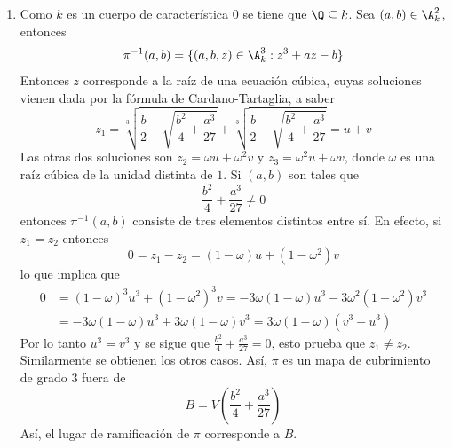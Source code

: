 \documentclass{article}
\begin{document}
\begin{enumerate}
    \item[(c)] Como $k$ es un cuerpo de característica $0$ se tiene que $\Q\subseteq k$. Sea 
    $(a,b)\in\A_{k}^{2}$, entonces
    \begin{equation*}
        \pi^{-1}(a,b)=\{(a,b,z)\in\A_{k}^{3}:z^{3}+az-b\}
    \end{equation*}
    Entonces $z$ corresponde a la raíz de una ecuación cúbica, cuyas soluciones vienen dada por la
    fórmula de Cardano-Tartaglia, a saber
    \begin{equation*}
        z_{1}=\sqrt[3]{\frac{b}{2}+\sqrt{\frac{b^{2}}{4}+\frac{a^{3}}{27}}}
        +\sqrt[3]{\frac{b}{2}-\sqrt{\frac{b^{2}}{4}+\frac{a^{3}}{27}}}=u+v
    \end{equation*}
    Las otras dos soluciones son $z_{2}=\omega u+\omega^{2} v$ y $z_{3}=\omega^{2} u+\omega v$, 
    donde $\omega$ es una raíz cúbica de la unidad distinta de $1$. Si $(a,b)$ son tales que
    \begin{equation*}
        \frac{b^{2}}{4}+\frac{a^{3}}{27}\neq0
    \end{equation*}
    entonces $\pi^{-1}(a,b)$ consiste de tres elementos distintos entre sí. En efecto, si 
    $z_{1}=z_{2}$ entonces
    \begin{equation*}
        0=z_{1}-z_{2}=(1-\omega)u+(1-\omega^{2})v
    \end{equation*}
    lo que implica que
    \begin{align*}
        0 &= (1-\omega)^{3}u^{3}+(1-\omega^{2})^{3}v
        =-3\omega(1-\omega)u^{3}-3\omega^{2}(1-\omega^{2})v^{3} \\
        &= -3\omega(1-\omega)u^{3}+3\omega(1-\omega)v^{3}=3\omega(1-\omega)(v^{3}-u^{3})
    \end{align*}
    Por lo tanto $u^{3}=v^{3}$ y se sigue que $\frac{b^{2}}{4}+\frac{a^{3}}{27}=0$, esto prueba 
    que $z_{1}\neq z_{2}$. Similarmente se obtienen los otros casos. Así, $\pi$ es un mapa de 
    cubrimiento de grado $3$ fuera de
    \begin{equation*}
        B=V\left(\frac{b^{2}}{4}+\frac{a^{3}}{27}\right)
    \end{equation*}
    Así, el lugar de ramificación de $\pi$ corresponde a $B$.
    

\end{enumerate}
\end{document}
